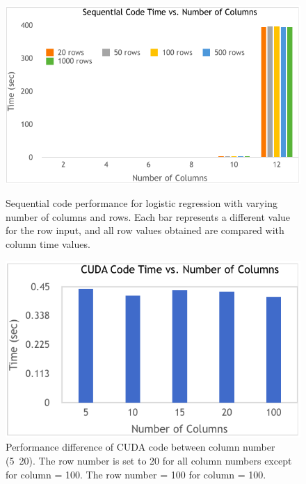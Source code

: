 \documentclass[letterpaper, 10 pt, conference]{ieeeconf}  %
\begin{document}
   \begin{figure}[thpb]
      \centering
  		\includegraphics[width=\linewidth]{seqcode2.png}
  		\label{fig:seq1}
  		\caption{Sequential code performance for logistic regression with varying number of columns and rows. Each bar represents a different value for the row input, and all row values obtained are compared with column time values.}
   \end{figure}

	\begin{figure}[thpb]
		\centering
		\includegraphics[width=\linewidth]{cudacolumns.png}

		\caption{Performance difference of CUDA code between column number (5~20). The row number is set to 20 for all column numbers except for column = 100. The row number = 100 for column = 100.}
	\end{figure}
\end{document}
